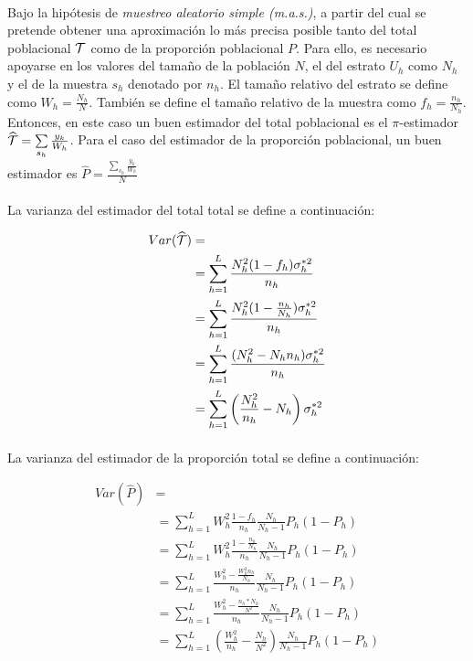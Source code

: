 \documentclass{article}
\begin{document}
    \paragraph{}
    Bajo la hipótesis de \emph{muestreo aleatorio simple (m.a.s.)}, a partir del cual se pretende obtener una aproximación lo más precisa posible tanto del total poblacional $\mathcal{T}$ como de la proporción poblacional $P$. Para ello, es necesario apoyarse en los valores del tamaño de la población $N$, el del estrato $U_h$ como $N_h$ y el de la muestra $s_h$ denotado por $n_h$. El tamaño relativo del estrato se define como $W_h = \frac{N_h}{N}$. También se define el tamaño relativo de la muestra como $f_h = \frac{n_h}{N_h}$. Entonces, en este caso un buen estimador del total poblacional es el $\pi$-estimador $\widehat{\mathcal{T}} = \sum\limits_{s_h} \frac{y_k}{W_h}$. Para el caso del estimador de la proporción poblacional, un buen estimador es $\widehat{P} = \frac{\sum\limits_{s_h} \frac{y_k}{W_h}}{N}$

    \paragraph{}
    La varianza del estimador del total total se define a continuación:

    \begin{align}
      Var(\widehat{\mathcal{T}}) &= \\
      &= \sum\limits_{h=1}^L\frac{N_h^2 (1-f_h)\sigma_h^{*2}}{n_h} \\
      &= \sum\limits_{h=1}^L\frac{N_h^2 (1-\frac{n_h}{N_h})\sigma_h^{*2}}{n_h} \\
      &= \sum\limits_{h=1}^L\frac{(N_h^2- N_hn_h)\sigma_h^{*2}}{n_h} \\
      &= \sum\limits_{h=1}^L\left(\frac{N_h^2}{n_h}- N_h\right)\sigma_h^{*2}
    \end{align}

    \paragraph{}
    La varianza del estimador de la proporción total se define a continuación:

    \begin{align}
      Var(\widehat{P}) &=\\
      &= \sum\limits_{h=1}^LW_h^2\frac{1-f_h}{n_h}\frac{N_h}{N_h-1}P_h(1-P_h) \\
      &= \sum\limits_{h=1}^LW_h^2\frac{1-\frac{n_h}{N_h}}{n_h}\frac{N_h}{N_h-1}P_h(1-P_h) \\
      &= \sum\limits_{h=1}^L\frac{W_h^2-\frac{W_h^2n_h}{N_h}}{n_h}\frac{N_h}{N_h-1}P_h(1-P_h) \\
      &= \sum\limits_{h=1}^L\frac{W_h^2-\frac{n_h*N_h}{N^2}}{n_h}\frac{N_h}{N_h-1}P_h(1-P_h) \\
      &= \sum\limits_{h=1}^L\left(\frac{W_h^2}{n_h} - \frac{N_h}{N^2}\right)\frac{N_h}{N_h-1}P_h(1-P_h) \\
    \end{align}
\end{document}
